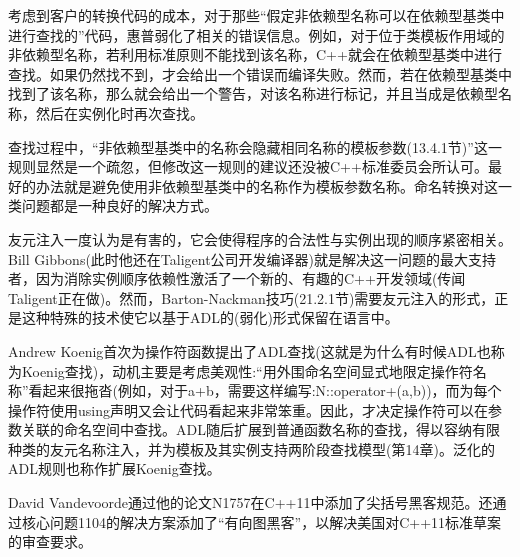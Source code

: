 考虑到客户的转换代码的成本，对于那些“假定非依赖型名称可以在依赖型基类中进行查找的”代码，惠普弱化了相关的错误信息。例如，对于位于类模板作用域的非依赖型名称，若利用标准原则不能找到该名称，C++就会在依赖型基类中进行查找。如果仍然找不到，才会给出一个错误而编译失败。然而，若在依赖型基类中找到了该名称，那么就会给出一个警告，对该名称进行标记，并且当成是依赖型名称，然后在实例化时再次查找。

查找过程中，“非依赖型基类中的名称会隐藏相同名称的模板参数(13.4.1节)”这一规则显然是一个疏忽，但修改这一规则的建议还没被C++标准委员会所认可。最好的办法就是避免使用非依赖型基类中的名称作为模板参数名称。命名转换对这一类问题都是一种良好的解决方式。

友元注入一度认为是有害的，它会使得程序的合法性与实例出现的顺序紧密相关。Bill Gibbons(此时他还在Taligent公司开发编译器)就是解决这一问题的最大支持者，因为消除实例顺序依赖性激活了一个新的、有趣的C++开发领域(传闻Taligent正在做)。然而，Barton-Nackman技巧(21.2.1节)需要友元注入的形式，正是这种特殊的技术使它以基于ADL的(弱化)形式保留在语言中。

Andrew Koenig首次为操作符函数提出了ADL查找(这就是为什么有时候ADL也称为Koenig查找)，动机主要是考虑美观性:“用外围命名空间显式地限定操作符名称”看起来很拖沓(例如，对于a+b，需要这样编写:N::operator+(a,b))，而为每个操作符使用using声明又会让代码看起来非常笨重。因此，才决定操作符可以在参数关联的命名空间中查找。ADL随后扩展到普通函数名称的查找，得以容纳有限种类的友元名称注入，并为模板及其实例支持两阶段查找模型(第14章)。泛化的ADL规则也称作扩展Koenig查找。

David Vandevoorde通过他的论文N1757在C++11中添加了尖括号黑客规范。还通过核心问题1104的解决方案添加了“有向图黑客”，以解决美国对C++11标准草案的审查要求。